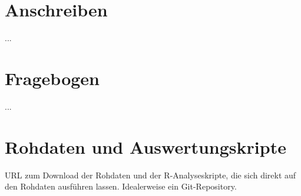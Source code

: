 \documentclass[de]{agse-empir-report}\usepackage[]{graphicx}\usepackage[]{color}
\begin{document}
\nocite{*}




\appendix

\section{Anschreiben}

...


\section{Fragebogen}

...


\section{Rohdaten und Auswertungskripte}

URL zum Download der Rohdaten und der R-Analyseskripte, die sich direkt auf den
Rohdaten ausführen lassen.
Idealerweise ein Git-Repository.
\end{document}
